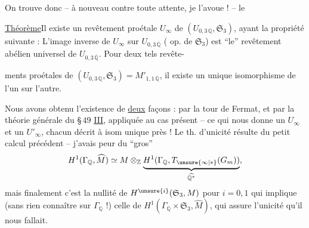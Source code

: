 On trouve donc -- à nouveau contre toute attente, je l'avoue ! -- le

\uline{Théorème}\quad Il existe un revêtement
proétale  $U_\infty$ de $(U_{0,3\,\mathbb Q},\mathfrak S_3)$, ayant la propriété suivante : L'image inverse  de $U_\infty$ sur $U_{0,3\,\overline{\mathbb Q}}$ ( op. de $\mathfrak S_3$) est ``le'' revêtement abélien universel de $U_{0,3\,\overline{\mathbb Q}}$. Pour deux tels revête-




ments proétales de $(U_{0,3\,\mathbb Q},\mathfrak S_3)=M'_{1,1\,\mathbb Q}$, il existe un unique isomorphisme de l'un sur l'autre.

Nous avons obtenu l'existence de \uline{deux} façons : par la tour de Fermat, et par la théorie générale du \S\,$49$ \uline{III}, appliquée au cas présent -- ce qui nous donne un $U_\infty$ et un $U'_\infty$, chacun décrit à isom unique près ! Le th. d'unicité résulte du petit calcul précédent -- j'avais peur du ``gros'' 
\[
H^1(\Gamma_{\mathbb Q},\widehat M)\simeq
M\otimes_{\mathbb Z}\underbrace{H^1(\Gamma_{\mathbb Q},T_{\unsure{\infty|*}}(G_m))}_{\widehat{\mathbb Q^{*}}},
\]
mais finalement c'est la nullité de $H^{\unsure{i}}(\mathfrak S_3,M)$ pour $i=0,1$ qui implique (sans rien connaître sur $\Gamma_{\mathbb Q}$ !) celle de $H^1(\Gamma_{\mathbb Q}\times\mathfrak S_3,\widehat M)$, qui assure l'unicité qu'il nous fallait.





